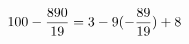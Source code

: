\documentclass[preview]{standalone}
\begin{document}
\begin{align*}
\special{dvisvgm:raw <g id='unique000'>}100 - \frac{890}{19} = 3 - 9 (- \frac{89}{19}) + 8\special{dvisvgm:raw </g>}
\end{align*}
\end{document}
